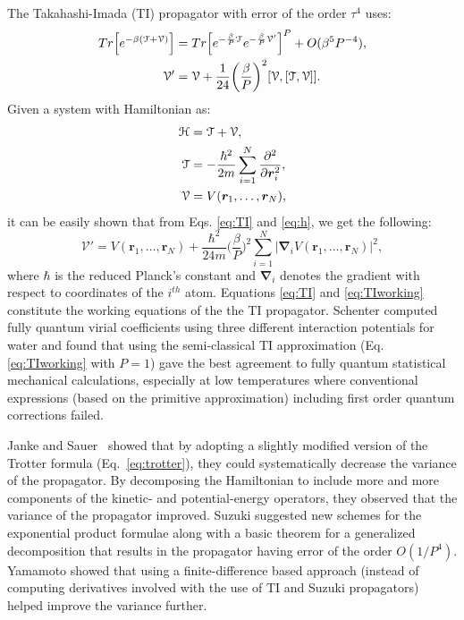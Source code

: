         The Takahashi-Imada (TI) propagator \cite{Takahashi1984} with error of the order $\tau^4$ uses:
        \begin{equation}\label{eq:TI}
            \begin{aligned}
                Tr \Big[ e^{- \beta ( \text{$\mathcal{T}$} + \text{$\mathcal{V}$} )} \Big] &= Tr \Big[ e^{ -\frac{\beta}{P} \text{$\mathcal{T}$}} e^{-\frac{\beta}{P} \mathcal{V'}} \Big]^P + O (\beta^5 P^{-4}),\\
                \mathcal{V'} &= \text{$\mathcal{V}$} + \frac{1}{24} \bigg( \frac{\beta}{P} \bigg)^2 [\text{$\mathcal{V}$}, [\text{$\mathcal{T}$}, \text{$\mathcal{V}$}]].
            \end{aligned}
        \end{equation}
        Given a system with Hamiltonian  as:
        \begin{equation}\label{eq:h}
            \begin{aligned}
                \text{$\mathcal{H}$} &= \text{$\mathcal{T}$} + \text{$\mathcal{V}$},\\
                \text{$\mathcal{T}$} &= -\displaystyle\frac{\hbar^2}{2m} \sum\limits_{i=1}^N \frac{\partial^2}{\partial \bm{r}_i^2},\\
                \text{$\mathcal{V}$} &= V (\bm{r}_1, \ldots , \bm{r}_N),
            \end{aligned}
        \end{equation}
        it can be easily shown that from Eqs. \eqref{eq:TI} and \eqref{eq:h}, we get the following:
        \begin{equation}\label{eq:TIworking}
            \mathcal{V'} = V (\bm{r}_1, \ldots ,\bm{r}_N) + \frac{\hbar^2}{24m} \bigg(\frac{\beta}{P} \bigg)^2 \displaystyle\sum\limits_{i=1}^N \big|\pmb{\nabla}_i V (\bm{r}_1, \ldots ,\bm{r}_N) \big|^2,
        \end{equation}
        where $\hbar$ is the reduced Planck's constant and $\pmb{\nabla}_i$ denotes the gradient with respect to coordinates of the $i^{th}$ atom. Equations \eqref{eq:TI} and \eqref{eq:TIworking} constitute the working equations of the the TI propagator. Schenter \cite{Schenter2002} computed fully quantum virial coefficients using three different interaction potentials for water and found that using the semi-classical TI approximation (Eq. \eqref{eq:TIworking} with $P = 1$) gave the best agreement to fully quantum statistical mechanical calculations, especially at low temperatures where conventional expressions (based on the primitive approximation) including first order quantum corrections failed.

        Janke and Sauer~\cite{Janke1992} showed that by adopting a slightly modified version of the Trotter formula (Eq.~\eqref{eq:trotter}), they could systematically decrease the variance of the propagator. By decomposing the Hamiltonian to include more and more components of the kinetic- and potential-energy operators, they observed that the variance of the propagator improved.
        Suzuki \cite{Suzuki1995} suggested new schemes for the exponential product formulae along with a basic theorem for a generalized decomposition that results in the propagator having error of the order $O(1/P^4)$. Yamamoto \cite{Yamamoto2005} showed that using a finite-difference based approach (instead of computing derivatives involved with the use of TI and Suzuki propagators) helped improve the variance further.
